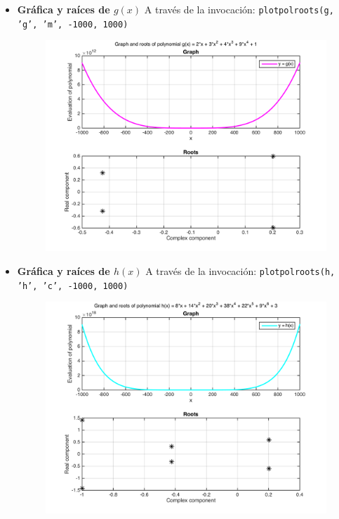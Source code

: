 \documentclass[11pt, spanish]{article}
\begin{document}
\begin{enumerate}
\begin{itemize}
\item \textbf{Gráfica y raíces de $g(x)$} A través de la invocación: \texttt{plotpolroots(g, 'g', 'm', -1000, 1000)}

\begin{figure}[H]
\centering
	\includegraphics[scale=0.6]{data/img/gplot}
	\caption{}
\end{figure}

\newpage

\item \textbf{Gráfica y raíces de $h(x)$} A través de la invocación: \texttt{plotpolroots(h, 'h', 'c', -1000, 1000)}

\begin{figure}[H]
\centering
	\includegraphics[scale=0.6]{data/img/hplot}
	\caption{}
\end{figure}


\end{itemize}
\end{enumerate}
\end{document}
